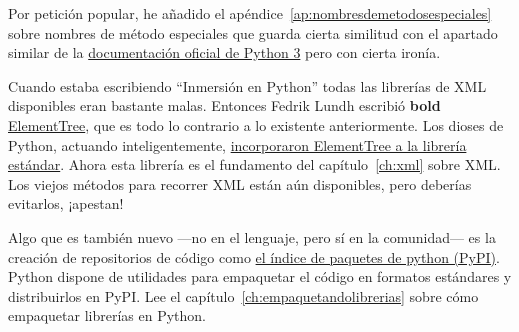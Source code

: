 Por petición popular, he añadido el apéndice~\ref{ap:nombresdemetodosespeciales} sobre nombres de método especiales que guarda cierta similitud con el apartado similar de la \href{http://www.python.org/doc/3.1/reference/datamodel.html#special-method-names}{documentación oficial de Python 3} pero con cierta ironía.

Cuando estaba escribiendo ``Inmersión en Python'' todas las librerías de XML disponibles eran bastante malas. Entonces Fedrik Lundh escribió \textbf{bold} \href{http://effbot.org/zone/element-index.htm}{ElementTree}, que es todo lo contrario a lo existente anteriormente. Los dioses de Python, actuando inteligentemente, \href{http://docs.python.org/3.1/library/xml.etree.elementtree.html}{incorporaron ElementTree a la librería estándar}. Ahora esta librería es el fundamento del capítulo~\ref{ch:xml} sobre XML. Los viejos métodos para recorrer XML están aún disponibles, pero deberías evitarlos, ¡apestan!

Algo que es también nuevo ---no en el lenguaje, pero sí en la comunidad--- es la creación de repositorios de código como \href{http://pypi.python.org/}{el índice de paquetes de python (PyPI)}. Python dispone de utilidades para empaquetar el código en formatos estándares y distribuirlos en PyPI. Lee el capítulo~\ref{ch:empaquetandolibrerias} sobre  cómo empaquetar librerías en Python.
\newpage
